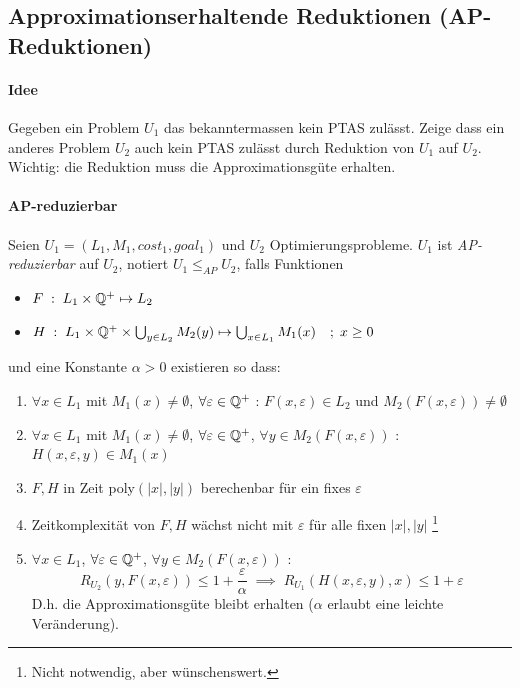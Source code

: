 \subsection{Approximationserhaltende Reduktionen (AP-Reduktionen)}
\label{sec:ap-reduktionen}

\paragraph{Idee}
Gegeben ein Problem $U_1$ das bekanntermassen kein PTAS zulässt.
Zeige dass ein anderes Problem $U_2$ auch kein PTAS zulässt durch Reduktion von $U_1$ auf $U_2$.
Wichtig: die Reduktion muss die Approximationsgüte erhalten.

\paragraph{AP-reduzierbar}
Seien $U_1 = (L_1, M_1, cost_1, goal_1)$ und $U_2$ Optimierungsprobleme.
$U_1$ ist \emph{AP-reduzierbar} auf $U_2$, notiert $U_1 \leq_{AP} U_2$, falls Funktionen
\begin{itemize}
    \item $ F \; : \; L_1 \times \mathbb{Q}^+ \mapsto L_2 $
    \item $ H \; : \; L_1 \times \mathbb{Q}^+ \times \bigcup_{y \in L_2} M_2(y) \mapsto \bigcup_{x \in L_1} M_1(x) \quad ; \; x \geq 0 $
\end{itemize}
und eine Konstante $\alpha > 0$ existieren so dass:
\begin{enumerate}[label=(\roman*)]
    \item $\forall x \in L_1$ mit $M_1(x) \neq \emptyset$, $\forall \varepsilon \in \mathbb{Q}^+$ : \quad
        $F(x, \varepsilon) \in L_2$ und $M_2(F(x, \varepsilon)) \neq \emptyset$
    \item $\forall x \in L_1$ mit $M_1(x) \neq \emptyset$, $\forall \varepsilon \in \mathbb{Q}^+$,
        $\forall y \in M_2(F(x, \varepsilon))$ : \quad
        $H(x, \varepsilon, y) \in M_1(x)$
    \item $F, H$ in Zeit poly$(|x|, |y|)$ berechenbar für ein fixes $\varepsilon$
    \item Zeitkomplexität von $F,H$ wächst nicht mit $\varepsilon$ für alle fixen $|x|, |y|$
        \footnote{Nicht notwendig, aber wünschenswert.}
    \item $\forall x \in L_1$, $\forall \varepsilon \in \mathbb{Q}^+$, $\forall y \in M_2(F(x, \varepsilon))$ : \quad
        $$ R_{U_2}(y, F(x,\varepsilon)) \leq 1 + \frac{\varepsilon}{\alpha}
        \; \implies \; R_{U_1}(H(x, \varepsilon, y), x) \leq 1 + \varepsilon $$
        D.h. die Approximationsgüte bleibt erhalten ($\alpha$ erlaubt eine leichte Veränderung).
\end{enumerate}

